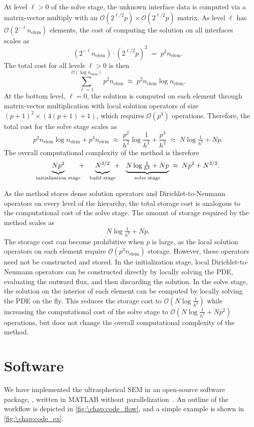 At level $\ell > 0$ of the solve stage, the unknown interface data is computed via a matrix-vector multiply with an $\mathcal{O}(2^{\ell/2}p) \times \mathcal{O}(2^{\ell/2}p)$ matrix. As level $\ell$ has $\mathcal{O}(2^{-\ell} n_\text{elem})$ elements, the cost of computing the solution on all interfaces scales as
\[
\left(2^{-\ell} n_\text{elem}\right) \cdot \left(2^{\ell/2}p\right)^2 \;=\; p^2 n_\text{elem}.
\]
The total cost for all levels $\ell > 0$ is then
\[
\sum_{\ell=1}^{\mathcal{O}(\log n_\text{elem})} p^2 n_\text{elem} \;\approx\; p^2 n_\text{elem} \log n_\text{elem}.
\]
At the bottom level, $\ell = 0$, the solution is computed on each element through matrix-vector multiplication with local solution operators of size $(p+1)^2 \times (4(p+1)+1)$, which requires $\mathcal{O}(p^3)$ operations. Therefore, the total cost for the solve stage scales as
\[
p^2 n_\text{elem} \log n_\text{elem} + p^3 n_\text{elem} \;\approx\; \frac{p^2}{h^2} \log \frac{1}{h^2} + \frac{p^3}{h^2} \;\approx\; N \log \tfrac{1}{h^2} + N p.
\]
The overall computational complexity of the method is therefore
\[
 \underbrace{\vphantom{\tfrac12}Np^2}_{\text{initialization stage}} \!\!+\;\; \underbrace{\vphantom{\tfrac12}N^{3/2}}_{\text{build stage}} \!\!+\;\;\, \underbrace{N \log \tfrac{1}{h^2} + N p}_{\text{solve stage}} \;\approx\; Np^2 + N^{3/2}.
\]

As the method stores dense solution operators and Dirichlet-to-Neumann operators on every level of the hierarchy, the total storage cost is analogous to the computational cost of the solve stage. The amount of storage required by the method scales as
\[
N \log \tfrac{1}{h^2} + N p.
\]
The storage cost can become prohibitive when $p$ is large, as the local solution operators on each element require $\mathcal{O}(p^3 n_\text{elem})$ storage. However, these operators need not be constructed and stored. In the initialization stage, local Dirichlet-to-Neumann operators can be constructed directly by locally solving the PDE, evaluating the outward flux, and then discarding the solution. In the solve stage, the solution on the interior of each element can be computed by locally solving the PDE on the fly. This reduces the storage cost to $\mathcal{O}(N \log \tfrac{1}{h^2})$ while increasing the computational cost of the solve stage to $\mathcal{O}(N \log \tfrac{1}{h^2} + N p^2)$ operations, but does not change the overall computational complexity of the method.

\section{Software}\label{sec:\chap:software}
We have implemented the ultraspherical SEM in an open-source software package, \ultraSEM, written in MATLAB without parallelization~\cite{GithubRepoUltraSEM}. An outline of the workflow is depicted in \cref{fig:\chap:code_flow}, and a simple example is shown in \cref{fig:\chap:code_ex}.

